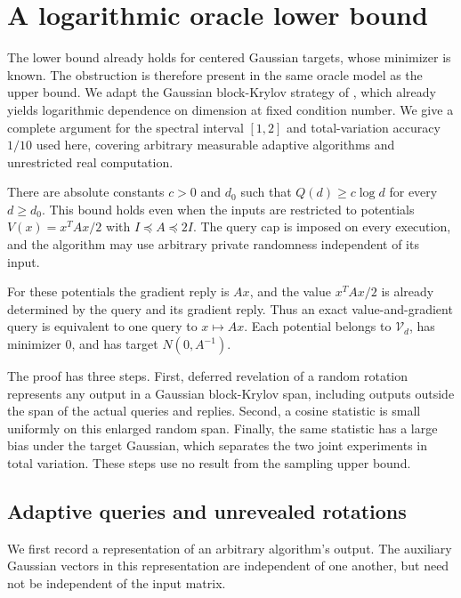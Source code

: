 \section{A logarithmic oracle lower bound}
\label{sec:lower}

The lower bound already holds for centered Gaussian targets, whose
minimizer is known. The obstruction is therefore present in the same
oracle model as the upper bound. We adapt the Gaussian block-Krylov
strategy of
\citet[Section~5.3.3, Lemma~39 and Theorem~45]{chewi2023lower},
which already yields logarithmic dependence on dimension at fixed
condition number. We give a complete argument for the spectral interval
$[1,2]$ and total-variation accuracy $1/10$ used here, covering arbitrary
measurable adaptive algorithms and unrestricted real computation.

\begin{theorem}\label{thm:lower}
There are absolute constants $c>0$ and $d_0$ such that $Q(d)\ge c\log d$
for every $d\ge d_0$. This bound holds even when the inputs are restricted
to potentials $V(x)=x^TAx/2$ with $I\preceq A\preceq2I$.
The query cap is imposed on every execution, and the algorithm may use
arbitrary private randomness independent of its input.
\end{theorem}

For these potentials the gradient reply is $Ax$, and the value
$x^TAx/2$ is already determined by the query and its gradient reply.
Thus an exact value-and-gradient query is equivalent to one query to
$x\mapsto Ax$. Each potential belongs to $\mathcal V_d$, has minimizer
$0$, and has target $N(0,A^{-1})$.

The proof has three steps. First, deferred revelation of a random
rotation represents any output in a Gaussian block-Krylov span, including
outputs outside the span of the actual queries and replies. Second, a
cosine statistic is small uniformly on this enlarged random span.
Finally, the same statistic has a large bias under the target Gaussian,
which separates the two joint experiments in total variation. These
steps use no result from the sampling upper bound.

\subsection{Adaptive queries and unrevealed rotations}

We first record a representation of an arbitrary algorithm's output.
The auxiliary Gaussian vectors in this representation are independent of
one another, but need not be independent of the input matrix.

